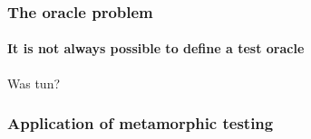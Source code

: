
\begin{frame}
\frametitle{The oracle problem}
\framesubtitle{It is not always possible to define a test oracle}
  \begin{center}
  \end{center}
	Was tun? \\
	\citet{MetamorphicTesting2016,segura_metamorphic_2020,kanewala_metamorphic_2019}
\end{frame}


\begin{frame}
\frametitle{Application of metamorphic testing}
\framesubtitle{\citet{segura_metamorphic_2020}}
  \begin{center}
  \end{center}
\end{frame}


